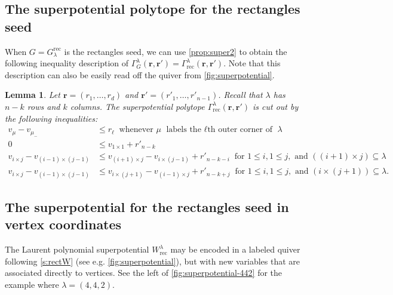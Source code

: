 \documentclass{amsart}
\newtheorem{lemma}[thm]{Lemma}
\theoremstyle{definition}
\numberwithin{equation}{section}
\newcommand{\muminus}{\mu_{-}}
\newcommand{\rect}{\mathrm{rec}}
\begin{document}
\subsection{The superpotential polytope for the rectangles seed}
When $G = G_{\lambda}^{\rect}$ is the rectangles seed,  we can use \cref{prop:super2}
to obtain the following inequality description of
$\Gamma^{\lambda}_G(\mathbf{r},\mathbf{r'}) = 
\Gamma^{\lambda}_{\rect}(\mathbf{r},\mathbf{r'})$.
Note that this description can also be easily read off the quiver from
\cref{fig:superpotential}.
\begin{lemma}\label{l:rectangles}
	Let  $\mathbf{r}=(r_1,\dots,r_d)$ and $\mathbf{r'}=(r'_1,\dots,r'_{n-1})$. Recall that $\lambda$ has $n-k$ rows and $k$ columns. 
	The superpotential polytope $\Gamma^{\lambda}_{\rect}(\mathbf{r},\mathbf{r'})$ 
is cut out by the following inequalities:
	\begin{align}
		v_{\mu} - v_{\muminus} & \leq r_\ell\ \text{ whenever }\mu 
		\text{ labels the $\ell$th outer corner of }\lambda  \label{eq:1gen}\\
		0 & \leq v_{1 \times 1}+r'_{n-k} \label{eq:2gen} \\
		v_{i\times j} - v_{(i-1)\times (j-1)} &\leq
		v_{(i+1) \times j}  - v_{i\times (j-1)}+r'_{n-k-i}
\ \text{ for }1 \leq i, 
		1\leq j, \text{ and } ((i+1) \times j) \subseteq \lambda \label{eq:3gen}\\
v_{i\times j}-v_{(i-1)\times (j-1)} &\leq
		v_{i\times (j+1)}  - v_{(i-1)\times j} + r'_{n-k+j}
\ \text{ for } 1\leq i,
		1 \leq j, \text{ and } (i \times (j+1)) \subseteq \lambda. \label{eq:4gen}
	\end{align}
\end{lemma}


\subsection{The superpotential for the rectangles seed in vertex coordinates}\label{s:vertexcoordinates}

The Laurent polynomial superpotential $W_{\rect}^{\lambda}$
may be encoded in a labeled quiver 
following \cref{s:rectW}
(see e.g. \cref{fig:superpotential}),
 but with new variables that are associated directly to vertices.   
See the left of \cref{fig:superpotential-442} for the example where
$\lambda = (4,4,2)$.
\end{document}
